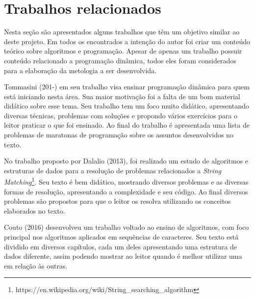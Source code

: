 
\chapter{Trabalhos relacionados}
\label{chap:historico}

Nesta seção são apresentados alguns trabalhos que têm um objetivo similar ao deste projeto. Em todos os encontrados a intenção do autor foi criar um conteúdo teórico sobre algoritmos e programação. Apesar de apenas um trabalho possuir conteúdo relacionado a programação dinâmica, todos eles foram considerados para a elaboração da metologia a ser desenvolvida.

Tommasini (201-) em seu trabalho visa ensinar programação dinâmica para quem está iniciando nesta área. Sua maior motivação foi a falta de um bom material didático sobre esse tema. Seu trabalho tem um foco muito didático, apresentando diversas técnicas, problemas com soluções e propondo vários exercícios para o leitor praticar o que foi ensinado. Ao final do trabalho é apresentada uma lista de problemas de maratonas de programação sobre os assuntos desenvolvidos no texto.


No trabalho proposto por Dalalio (2013), foi realizado um estudo de algoritmos e estruturas de dados para a resolução de problemas relacionados a \textit{String Matching}\footnote{https://en.wikipedia.org/wiki/String\_searching\_algorithm}. Seu texto é bem didático, mostrando diversos problemas e as diversas formas de resolução, apresentando a complexidade e seu código. Ao final diversos problemas são propostos para que o leitor os resolva utilizando os conceitos elaborados no texto.


Couto (2016) desenvolveu um trabalho voltado ao ensino de algoritmos, com foco principal nos algoritmos aplicados em sequências de caracteres. Seu texto está dividido em diversos capítulos, cada um deles apresentando uma estrutura de dados diferente, assim podendo mostrar ao leitor quando é melhor utilizar uma em relação às outras.






